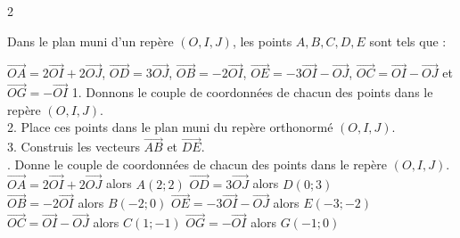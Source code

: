 \begin{multicols*}{2}
\begin{enumerate}
  	\end{enumerate}
  	
  	Dans le plan muni d'un repère $(O, I, J)$, les points $A, B, C, D, E$ sont tels que :
  	
  	$ \overrightarrow{OA} = 2\overrightarrow{OI} + 2\overrightarrow{OJ}$,  $  \overrightarrow{OD} = 3\overrightarrow{OJ} $,  $
  	\overrightarrow{OB} = -2\overrightarrow{OI} $,  $ \overrightarrow{OE} = -3\overrightarrow{OI} - \overrightarrow{OJ} $,  $
  	\overrightarrow{OC} = \overrightarrow{OI} - \overrightarrow{OJ} $ et $ \overrightarrow{OG} = -\overrightarrow{OI}
  	$
  	1. Donnons le couple de coordonnées de chacun des points dans le repère $(O, I, J)$. \\
  	
  	2. Place ces points dans le plan muni du repère orthonormé $(O, I, J)$. \\
  	3. Construis les vecteurs $\overrightarrow{AB}$ et $\overrightarrow{DE}$.\\
  	\dure 
  	. Donne le couple de coordonnées de chacun des points dans le repère $(O, I, J)$. \\ 
  	$ \overrightarrow{OA} = 2\overrightarrow{OI} + 2\overrightarrow{OJ}$ alors $ A(2;2) $   $  \overrightarrow{OD} = 3\overrightarrow{OJ} $  alors $ D(0;3) $\\  $
  	\overrightarrow{OB} = -2\overrightarrow{OI} $ alors $ B(-2;0) $   $ \overrightarrow{OE} = -3\overrightarrow{OI} - \overrightarrow{OJ} $ alors $ E(-3;-2) $\\  $
  	\overrightarrow{OC} = \overrightarrow{OI} - \overrightarrow{OJ} $ alors $ C(1;-1) $ 
  	$ \overrightarrow{OG} = -\overrightarrow{OI}
  	$ alors $ G(-1;0) $
  	

\end{multicols*}
